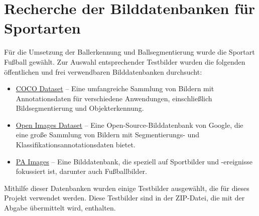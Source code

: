 \section{Recherche der Bilddatenbanken für Sportarten}

Für die Umsetzung der Ballerkennung und Ballsegmentierung wurde die Sportart Fußball gewählt. Zur Auswahl entsprechender Testbilder wurden die folgenden öffentlichen und frei verwendbaren Bilddatenbanken durchsucht:

\begin{itemize}
  \item \href{https://cocodataset.org/#explore}{COCO Dataset} – Eine umfangreiche Sammlung von Bildern mit Annotationsdaten für verschiedene Anwendungen, einschließlich Bildsegmentierung und Objekterkennung.
  \item \href{https://storage.googleapis.com/openimages/web/visualizer/index.html?type=segmentation\&set=train\&r=false\&c=%2Fm%2F01226z}{Open Images Dataset} – Eine Open-Source-Bilddatenbank von Google, die eine große Sammlung von Bildern mit Segmentierungs- und Klassifikationsannotationsdaten bietet.
  \item \href{https://www.paimages.co.uk/search-results/fluid/?q=football\%20game\&category=A,S,E\&fields_0=all\&fields_1=all\&imagesonly=1\&order=relevance\&orientation=both\&words_0=all\&words_1=all}{PA Images} – Eine Bilddatenbank, die speziell auf Sportbilder und -ereignisse fokussiert ist, darunter auch Fußballbilder.
\end{itemize}

Mithilfe dieser Datenbanken wurden einige Testbilder ausgewählt, die für dieses Projekt verwendet werden. Diese Testbilder sind in der ZIP-Datei, die mit der Abgabe übermittelt wird, enthalten.
